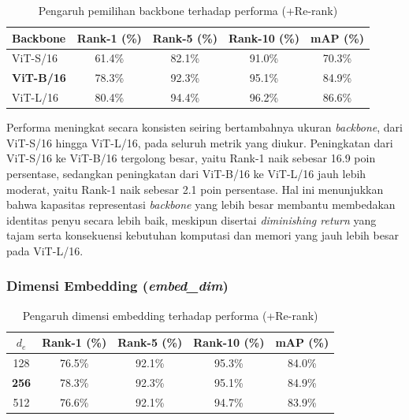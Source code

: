\begin{table}[H]
    \centering
    \caption{Pengaruh pemilihan backbone terhadap performa (+Re-rank)}
    \label{tab:var_backbone}
    \renewcommand{\arraystretch}{1.25}
    \begin{tabular}{lcccc}
        \hline
        \textbf{Backbone} & \textbf{Rank-1 (\%)} & \textbf{Rank-5 (\%)} & \textbf{Rank-10 (\%)} & \textbf{mAP (\%)} \\
        \hline
        ViT-S/16          & 61.4\%               & 82.1\%               & 91.0\%                & 70.3\%            \\
        \textbf{ViT-B/16} & 78.3\%               & 92.3\%               & 95.1\%                & 84.9\%            \\
        ViT-L/16          & 80.4\%               & 94.4\%               & 96.2\%                & 86.6\%            \\
        \hline
    \end{tabular}
\end{table}

Performa meningkat secara konsisten seiring bertambahnya ukuran \textit{backbone}, dari ViT-S/16 hingga ViT-L/16, pada seluruh metrik yang diukur. Peningkatan dari ViT-S/16 ke ViT-B/16 tergolong besar, yaitu Rank-1 naik sebesar 16.9 poin persentase, sedangkan peningkatan dari ViT-B/16 ke ViT-L/16 jauh lebih moderat, yaitu Rank-1 naik sebesar 2.1 poin persentase. Hal ini menunjukkan bahwa kapasitas representasi \textit{backbone} yang lebih besar membantu membedakan identitas penyu secara lebih baik, meskipun disertai \textit{diminishing return} yang tajam serta konsekuensi kebutuhan komputasi dan memori yang jauh lebih besar pada ViT-L/16.

\subsubsection{Dimensi Embedding (\textit{embed\_dim})}

\begin{table}[H]
    \centering
    \caption{Pengaruh dimensi embedding terhadap performa (+Re-rank)}
    \label{tab:var_embeddim}
    \renewcommand{\arraystretch}{1.25}
    \begin{tabular}{ccccc}
        \hline
        $d_e$        & \textbf{Rank-1 (\%)} & \textbf{Rank-5 (\%)} & \textbf{Rank-10 (\%)} & \textbf{mAP (\%)} \\
        \hline
        128          & 76.5\%               & 92.1\%               & 95.3\%                & 84.0\%            \\
        \textbf{256} & 78.3\%               & 92.3\%               & 95.1\%                & 84.9\%            \\
        512          & 76.6\%               & 92.1\%               & 94.7\%                & 83.9\%            \\
        \hline
    \end{tabular}
\end{table}

